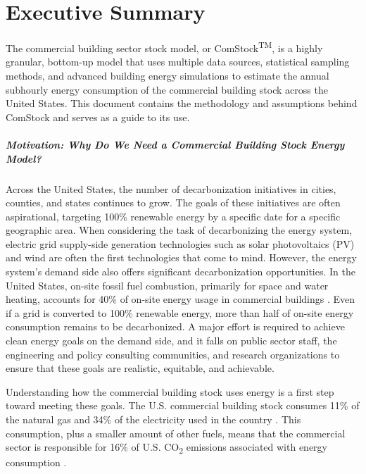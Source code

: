 \chapter{Executive Summary} 
The commercial building sector stock model, or ComStock\textsuperscript{TM}, is a highly granular, bottom-up model that uses multiple data sources, statistical sampling methods, and advanced building energy simulations to estimate the annual subhourly energy consumption of the commercial building stock across the United States. This document contains the methodology and assumptions behind ComStock and serves as a guide to its use.

\paragraph{Motivation: Why Do We Need a Commercial Building Stock Energy Model?}
Across the United States, the number of decarbonization initiatives in cities, counties, and states continues to grow. The goals of these initiatives are often aspirational, targeting 100\% renewable energy by a specific date for a specific geographic area. When considering the task of decarbonizing the energy system, electric grid supply-side generation technologies such as solar photovoltaics (PV) and wind are often the first technologies that come to mind. However, the energy system's demand side also offers significant decarbonization opportunities. In the United States, on-site fossil fuel combustion, primarily for space and water heating, accounts for 40\% of on-site energy usage in commercial buildings \citep{eia2018cbecs}. Even if a grid is converted to 100\% renewable energy, more than half of on-site energy consumption remains to be decarbonized. A major effort is required to achieve clean energy goals on the demand side, and it falls on public sector staff, the engineering and policy consulting communities, and research organizations to ensure that these goals are realistic, equitable, and achievable.

Understanding how the commercial building stock uses energy is a first step toward meeting these goals. The U.S. commercial building stock consumes 11\% of the natural gas and 34\% of the electricity used in the country \citep{eia_natural_gas}. This consumption, plus a smaller amount of other fuels, means that the commercial sector is responsible for 16\% of U.S. CO\textsubscript{2} emissions associated with energy consumption \citep{eia_emissions_from_energy_consumption}.

